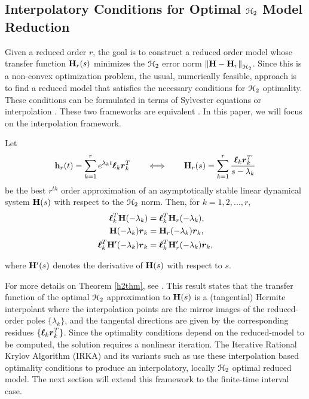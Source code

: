 \documentclass[twocolumn]{autart}
\begin{document}
\subsection{Interpolatory Conditions for Optimal $\EuScript{H}_2$ Model Reduction}
Given a reduced order $r$, the goal is to construct a reduced order model whose transfer function $\mathbf{H}_r(s)$ minimizes the $\EuScript{H}_2$ error norm $\left\lVert\mathbf{H} - \mathbf{H}_r\right\rVert_{\EuScript{H}_2}$.  Since this is a non-convex optimization problem, the usual, numerically feasible, approach  is to find a reduced model that satisfies the necessary conditions for $\EuScript{H}_2$ optimality. These conditions can be formulated in terms of Sylvester equations \cite{Wil70,HylB85} or interpolation \cite{MeiL67,GugBA08}. These two frameworks are equivalent \cite{GugBA08}. In this paper, we will focus on the interpolation framework.
\begin{theorem} \label{h2thm}%
Let 
$$
\mathbf{h}_r(t)=\sum_{k=1}^r e^{\lambda_kt}\boldsymbol{\ell}_k\boldsymbol{r}_k^T \qquad \Longleftrightarrow \qquad \mathbf{H}_r(s) = \sum_{k=1}^r \frac{\boldsymbol{\ell}_k\boldsymbol{r}_k^T}{s-\lambda_k}
$$
be the best $r^{th}$ order approximation of an asymptotically stable linear dynamical system  $\mathbf{H}(s)$ with respect to the $\EuScript{H}_2$ norm. Then, for $k=1, 2, ... , r$,
\begin{equation} \label{eqn:h2cond}
\begin{aligned}
\boldsymbol{\ell}_k^T\mathbf{H}(-\lambda_k)&=\boldsymbol{\ell}_k^T\mathbf{H}_r(-\lambda_k),\\~~
\mathbf{H}(-\lambda_k)\boldsymbol{r}_k&=\mathbf{H}_r(-\lambda_k)\boldsymbol{r}_k,\\
\boldsymbol{\ell}_k^T\mathbf{H}'(-\lambda_k)\boldsymbol{r}_k&=\boldsymbol{\ell}_k^T\mathbf{H}_r'(-\lambda_k)\boldsymbol{r}_k,
\end{aligned}
\end{equation}

where $\mathbf{H}'(s)$ denotes the derivative of $\mathbf{H}(s)$ with respect to $s$.
\end{theorem}
For more details on Theorem \ref{h2thm}, see {\cite {GugBA08,AntBG10b}}.
This result states that the transfer function of the optimal $\EuScript{H}_2$ approximation to $\mathbf{H}(s)$ is a (tangential) Hermite interpolant where the interpolation points are the mirror images of the reduced-order poles $\{\lambda_k\}$, and the tangental directions are given by the corresponding residues $\{\boldsymbol{\ell}_k\boldsymbol{r}_k^T\}$.  Since the optimality conditions depend on the reduced-model to be computed, the solution requires a nonlinear iteration. The Iterative Rational Krylov Algorithm (IRKA)  \cite{GugBA08} and its variants such as \cite{beattie2012realization,gerstner2007hom,CasL18,beattie2009trust} use these interpolation based optimality conditions to produce   an interpolatory, locally $\EuScript{H}_2$ optimal reduced model. The next section will extend this framework to the finite-time interval case.
\end{document}

